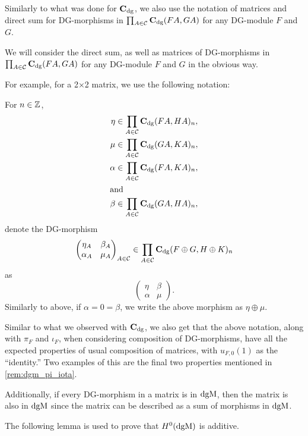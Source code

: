 Similarly to what was done for \( \operatorname{\mathbf{C}}_{\operatorname{dg}} \), we also use the notation of matrices and direct sum for DG-morphisms in \( \prod_{A \in {\mathcal{C}}} \operatorname{\mathbf{C}}_{\operatorname{dg}} (F A, G A) \) for any DG-module \( F \) and \( G \).
\begin{notation}
    We will consider the direct sum, as well as matrices of DG-morphisms in \( \prod_{A \in {\mathcal{C}}} \operatorname{\mathbf{C}}_{\operatorname{dg}} (F A, G A) \) for any DG-module \( F \) and \( G \) in the obvious way.

    For example, for a 2×2 matrix, we use the following notation:

    For \( n \in {\mathbb{Z}} \),
    \begin{align*}
        \eta &\in \prod_{A \in {\mathcal{C}}} \operatorname{\mathbf{C}}_{\operatorname{dg}}(F A, H A)_n, \\
        \mu &\in \prod_{A \in {\mathcal{C}}} \operatorname{\mathbf{C}}_{\operatorname{dg}}(G A, K A)_n, \\
        \alpha &\in \prod_{A \in {\mathcal{C}}} \operatorname{\mathbf{C}}_{\operatorname{dg}}(F A, K A)_n, \\
        \intertext{and}
        \beta &\in \prod_{A \in {\mathcal{C}}} \operatorname{\mathbf{C}}_{\operatorname{dg}}(G A, H A)_n,
    \end{align*}
    denote the DG-morphism
    \[
        \begin{pmatrix}
            \eta_A & \beta_A \\
            \alpha_A & \mu_A
        \end{pmatrix}_{A \in {\mathcal{C}}}
        \in
        \prod_{A \in {\mathcal{C}}} \operatorname{\mathbf{C}}_{\operatorname{dg}}(F \oplus G, H \oplus K)_n
    \]
    as
    \[
        \begin{pmatrix}
            \eta & \beta \\
            \alpha & \mu
        \end{pmatrix}.
    \]
    Similarly to above, if \( \alpha = 0 = \beta \), we write the above morphism as \( \eta \oplus \mu \).
\end{notation}

Similar to what we observed with \( \operatorname{\mathbf{C}}_{\operatorname{dg}} \), we also get that the above notation, along with \( \pi_F \) and \( \iota_F \), when considering composition of DG-morphisms, have all the expected properties of usual composition of matrices, with \( u_{F, 0}(1) \) as the ``identity.'' Two examples of this are the final two properties mentioned in \autoref{rem:dgm_pi_iota}.

Additionally, if every DG-morphism in a matrix is in \( \operatorname{dgM} \), then the matrix is also in \( \operatorname{dgM} \) since the matrix can be described as a sum of morphisms in \( \operatorname{dgM} \).

The following lemma is used to prove that \( H^0(\operatorname{dgM}) \) is additive.

